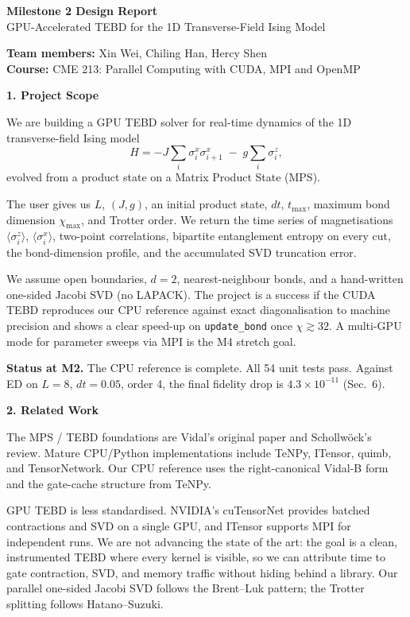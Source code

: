 \documentclass[11pt]{article}
\begin{document}
\begin{center}
{\Large \textbf{Milestone 2 Design Report}}\\[0.4em]
{\large GPU-Accelerated TEBD for the 1D Transverse-Field Ising Model}
\end{center}

\textbf{Team members:} Xin Wei, Chiling Han, Hercy Shen\\
\textbf{Course:} CME 213: Parallel Computing with CUDA, MPI and OpenMP

\vspace{0.5em}

\textbf{1. Project Scope}

We are building a GPU TEBD solver for real-time dynamics of the 1D transverse-field Ising model
\[
H = -J \sum_i \sigma^x_i \sigma^x_{i+1} \;-\; g \sum_i \sigma^z_i,
\]
evolved from a product state on a Matrix Product State (MPS).

The user gives us $L$, $(J, g)$, an initial product state, $dt$, $t_{\max}$, maximum bond dimension $\chi_{\max}$, and Trotter order. We return the time series of magnetisations $\langle\sigma^z_i\rangle$, $\langle\sigma^x_i\rangle$, two-point correlations, bipartite entanglement entropy on every cut, the bond-dimension profile, and the accumulated SVD truncation error.

We assume open boundaries, $d = 2$, nearest-neighbour bonds, and a hand-written one-sided Jacobi SVD (no LAPACK). The project is a success if the CUDA TEBD reproduces our CPU reference against exact diagonalisation to machine precision and shows a clear speed-up on \texttt{update\_bond} once $\chi \gtrsim 32$. A multi-GPU mode for parameter sweeps via MPI is the M4 stretch goal.

\textbf{Status at M2.} The CPU reference is complete. All 54 unit tests pass. Against ED on $L = 8$, $dt = 0.05$, order 4, the final fidelity drop is $4.3 \times 10^{-11}$ (Sec.~6).

\vspace{0.4em}
\textbf{2. Related Work}

The MPS / TEBD foundations are Vidal's original paper and Schollw\"ock's review. Mature CPU/Python implementations include TeNPy, ITensor, quimb, and TensorNetwork. Our CPU reference uses the right-canonical Vidal-B form and the gate-cache structure from TeNPy.

GPU TEBD is less standardised. NVIDIA's cuTensorNet provides batched contractions and SVD on a single GPU, and ITensor supports MPI for independent runs. We are not advancing the state of the art: the goal is a clean, instrumented TEBD where every kernel is visible, so we can attribute time to gate contraction, SVD, and memory traffic without hiding behind a library. Our parallel one-sided Jacobi SVD follows the Brent--Luk pattern; the Trotter splitting follows Hatano--Suzuki.
\end{document}
